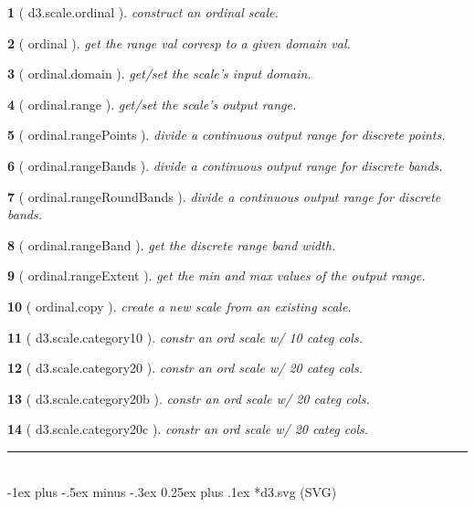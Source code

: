 \documentclass[10pt,landscape,letterpaper]{article}
\makeatletter
\newcounter{thm}
\newcommand{\hdrule}{\vspace{-4pt} \hdashrule[0.25ex]{\fill}{.5pt}{1pt}\vspace{-4pt}}
\theoremstyle{mytheoremstyle}
\newtheorem*{thm}{}
\renewcommand{\section}{\@startsection{section}{1}{0mm}%
                                {-1ex plus -.5ex minus -.3ex}%
                                {0.25ex plus .1ex}%
                                {\normalfont\large\bfseries}}
\makeatother
\begin{document}
\begin{multicols}{3}
\begin{thm} [ d3.scale.ordinal ]  construct an ordinal scale.
\end{thm}\begin{thm} [ ordinal ]  get the range val corresp to a given domain val.
\end{thm}\begin{thm} [ ordinal.domain ]  get/set the scale's input domain.
\end{thm}\begin{thm} [ ordinal.range ]  get/set the scale's output range.
\end{thm}\begin{thm} [ ordinal.rangePoints ]  divide a continuous output range for discrete points.
\end{thm}\begin{thm} [ ordinal.rangeBands ]  divide a continuous output range for discrete bands.
\end{thm}\begin{thm} [ ordinal.rangeRoundBands ]  divide a continuous output range for discrete bands.
\end{thm}\begin{thm} [ ordinal.rangeBand ]  get the discrete range band width.
\end{thm}\begin{thm} [ ordinal.rangeExtent ]  get the min and max values of the output range.
\end{thm}\begin{thm} [ ordinal.copy ]  create a new scale from an existing scale.
\end{thm}\begin{thm} [ d3.scale.category10 ]  constr an ord scale w/ 10 categ cols.
\end{thm}\begin{thm} [ d3.scale.category20 ]  constr an ord scale w/ 20 categ cols.
\end{thm}\begin{thm} [ d3.scale.category20b ]  constr an ord scale w/ 20 categ cols.
\end{thm}\begin{thm} [ d3.scale.category20c ]  constr an ord scale w/ 20 categ cols.
\end{thm}
\hrule
\hspace{1pt}\vspace*{2.35in}\\
\section*{d3.svg (SVG)}
\hdrule

\end{multicols}
\end{document}
